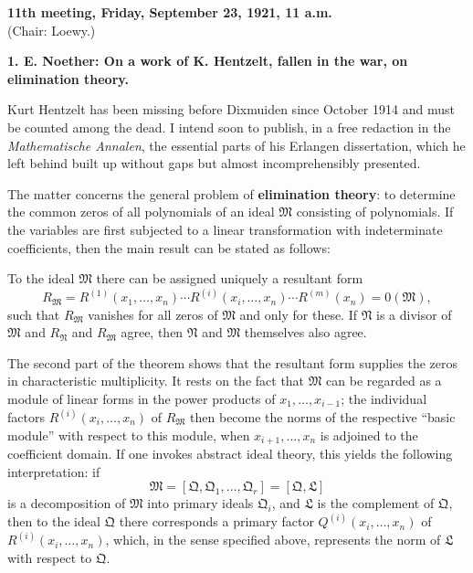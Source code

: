 \documentclass[11pt]{article}
\begin{document}
\begin{center}
\textbf{11th meeting, Friday, September 23, 1921, 11 a.m.}\\
(Chair: Loewy.)
\end{center}

\textbf{1. E. Noether: On a work of K. Hentzelt, fallen in the war, on elimination theory.}

Kurt Hentzelt has been missing before Dixmuiden since October 1914 and must be counted among the dead. I intend soon to publish, in a free redaction in the \emph{Mathematische Annalen}, the essential parts of his Erlangen dissertation, which he left behind built up without gaps but almost incomprehensibly presented.

The matter concerns the general problem of \textbf{elimination theory}: to determine the common zeros of all polynomials of an ideal $\mathfrak M$ consisting of polynomials. If the variables are first subjected to a linear transformation with indeterminate coefficients, then the main result can be stated as follows:

To the ideal $\mathfrak M$ there can be assigned uniquely a resultant form
\[
 R_{\mathfrak M}=R^{(1)}(x_1,
\ldots,x_n)\cdots R^{(i)}(x_i,
\ldots,x_n)\cdots R^{(m)}(x_n)=0(\mathfrak M),
\]
such that $R_{\mathfrak M}$ vanishes for all zeros of $\mathfrak M$ and only for these. If $\mathfrak N$ is a divisor of $\mathfrak M$ and $R_{\mathfrak N}$ and $R_{\mathfrak M}$ agree, then $\mathfrak N$ and $\mathfrak M$ themselves also agree.

The second part of the theorem shows that the resultant form supplies the zeros in characteristic multiplicity. It rests on the fact that $\mathfrak M$ can be regarded as a module of linear forms in the power products of $x_1,
\ldots,x_{i-1}$; the individual factors $R^{(i)}(x_i,
\ldots,x_n)$ of $R_{\mathfrak M}$ then become the norms of the respective ``basic module'' with respect to this module, when $x_{i+1},
\ldots,x_n$ is adjoined to the coefficient domain. If one invokes abstract ideal theory, this yields the following interpretation: if
\[
 \mathfrak M=[\mathfrak Q,\mathfrak Q_1,
\ldots,
\mathfrak Q_r]=[\mathfrak Q,\mathfrak L]
\]
is a decomposition of $\mathfrak M$ into primary ideals $\mathfrak Q_i$, and $\mathfrak L$ is the complement of $\mathfrak Q$, then to the ideal $\mathfrak Q$ there corresponds a primary factor $Q^{(i)}(x_i,
\ldots,x_n)$ of $R^{(i)}(x_i,
\ldots,x_n)$, which, in the sense specified above, represents the norm of $\mathfrak L$ with respect to $\mathfrak Q$.
\end{document}
